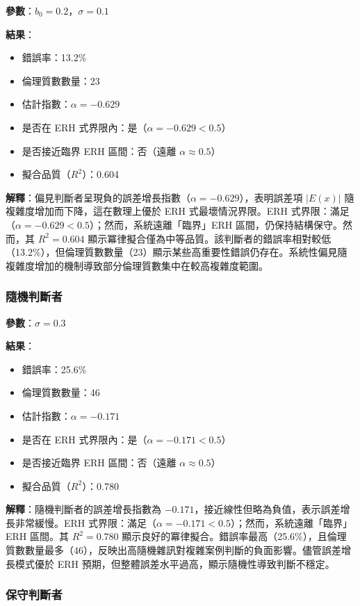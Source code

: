 \documentclass[12pt,a4paper]{article}
\theoremstyle{definition}
\theoremstyle{remark}
\begin{document}
\textbf{參數}：$b_0 = 0.2$，$\sigma = 0.1$

\textbf{結果}：
\begin{itemize}
    \item 錯誤率：13.2\%
    \item 倫理質數數量：23
    \item 估計指數：$\alpha = -0.629$
    \item 是否在 ERH 式界限內：是（$\alpha = -0.629 < 0.5$）
    \item 是否接近臨界 ERH 區間：否（遠離 $\alpha \approx 0.5$）
    \item 擬合品質（$R^2$）：0.604
\end{itemize}

\textbf{解釋}：偏見判斷者呈現負的誤差增長指數（$\alpha = -0.629$），表明誤差項 $|E(x)|$ 隨複雜度增加而下降，這在數理上優於 ERH 式最壞情況界限。ERH 式界限：滿足（$\alpha = -0.629 < 0.5$）；然而，系統遠離「臨界」ERH 區間，仍保持結構保守。然而，其 $R^2 = 0.604$ 顯示冪律擬合僅為中等品質。該判斷者的錯誤率相對較低（13.2\%），但倫理質數數量（23）顯示某些高重要性錯誤仍存在。系統性偏見隨複雜度增加的機制導致部分倫理質數集中在較高複雜度範圍。

\subsubsection{隨機判斷者}

\textbf{參數}：$\sigma = 0.3$

\textbf{結果}：
\begin{itemize}
    \item 錯誤率：25.6\%
    \item 倫理質數數量：46
    \item 估計指數：$\alpha = -0.171$
    \item 是否在 ERH 式界限內：是（$\alpha = -0.171 < 0.5$）
    \item 是否接近臨界 ERH 區間：否（遠離 $\alpha \approx 0.5$）
    \item 擬合品質（$R^2$）：0.780
\end{itemize}

\textbf{解釋}：隨機判斷者的誤差增長指數為 $-0.171$，接近線性但略為負值，表示誤差增長非常緩慢。ERH 式界限：滿足（$\alpha = -0.171 < 0.5$）；然而，系統遠離「臨界」ERH 區間。其 $R^2 = 0.780$ 顯示良好的冪律擬合。錯誤率最高（25.6\%），且倫理質數數量最多（46），反映出高隨機雜訊對複雜案例判斷的負面影響。儘管誤差增長模式優於 ERH 預期，但整體誤差水平過高，顯示隨機性導致判斷不穩定。

\subsubsection{保守判斷者}
\end{document}
